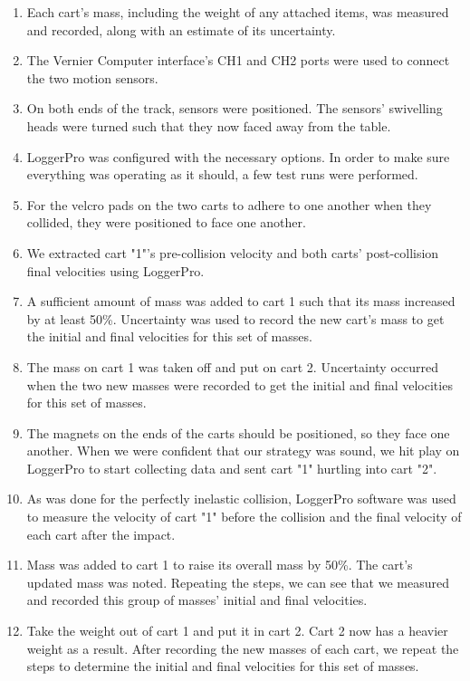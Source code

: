 

{}


{}

\begin{enumerate}
	\item {Each cart's mass, including the weight of any attached items, was measured and recorded, along with an estimate of its uncertainty.}
	\item {The Vernier Computer interface's CH1 and CH2 ports were used to connect the two motion sensors.}
	\item {On both ends of the track, sensors were positioned. The sensors' swivelling heads were turned such that they now faced away from the table.}
	\item {LoggerPro was configured with the necessary options. In order to make sure everything was operating as it should, a few test runs were performed.}
	\item {For the velcro pads on the two carts to adhere to one another when they collided, they were positioned to face one another.}
	\item {We extracted cart "1"'s pre-collision velocity and both carts' post-collision final velocities using LoggerPro.}
	\item {A sufficient amount of mass was added to cart 1 such that its mass increased by at least 50\%. Uncertainty was used to record the new cart's mass to get the initial and final velocities for this set of masses.}
	\item {The mass on cart 1 was taken off and put on cart 2. Uncertainty occurred when the two new masses were recorded to get the initial and final velocities for this set of masses.}
	\item {The magnets on the ends of the carts should be positioned, so they face one another.
When we were confident that our strategy was sound, we hit play on LoggerPro to start collecting data and sent cart "1" hurtling into cart "2".}
	\item {As was done for the perfectly inelastic collision, LoggerPro software was used to measure the velocity of cart "1" before the collision and the final velocity of each cart after the impact.}
	\item {Mass was added to cart 1 to raise its overall mass by 50\%. The cart's updated mass was noted. Repeating the steps, we can see that we measured and recorded this group of masses' initial and final velocities.}
	\item {Take the weight out of cart 1 and put it in cart 2. Cart 2 now has a heavier weight as a result. After recording the new masses of each cart, we repeat the steps to determine the initial and final velocities for this set of masses.}
\end{enumerate}


